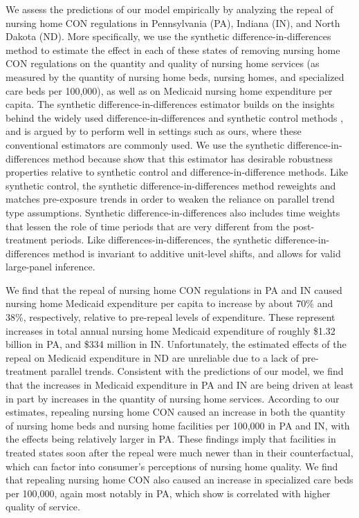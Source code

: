 \documentclass[../Main.tex]{subfiles}
\begin{document}
We assess the predictions of our model empirically by analyzing the repeal of nursing home CON regulations in Pennsylvania (PA), Indiana (IN), and North Dakota (ND). More specifically, we use the synthetic difference-in-differences method \citep{arkhangelsky2021synthetic} to estimate the effect in each of these states of removing nursing home CON regulations on the quantity and quality of nursing home services (as measured by the quantity of nursing home beds, nursing homes, and specialized care beds per 100,000), as well as on Medicaid nursing home expenditure per capita. The synthetic difference-in-differences estimator builds on the insights behind the widely used difference-in-differences and synthetic control methods \citep{abadie2003economic,abadie2010synthetic,currie2020technology}, and is argued by \citet{arkhangelsky2021synthetic} to perform well in settings such as ours, where these conventional estimators are commonly used. We use the synthetic difference-in-differences method because \citet{arkhangelsky2021synthetic} show that this estimator has desirable robustness properties relative to synthetic control and difference-in-difference methods. Like synthetic control, the synthetic difference-in-differences method reweights and matches pre-exposure trends in order to weaken the reliance on parallel trend type assumptions. Synthetic difference-in-differences also includes time weights that lessen the role of time periods that are very different from the post-treatment periods. Like differences-in-differences, the synthetic difference-in-differences method is invariant to additive unit-level shifts, and allows for valid large-panel inference.

We find that the repeal of nursing home CON regulations in PA and IN caused nursing home Medicaid expenditure per capita to increase by about 70\% and 38\%, respectively, relative to pre-repeal levels of expenditure. These represent increases in total annual nursing home Medicaid expenditure of roughly \$1.32 billion in PA, and \$334 million in IN. Unfortunately, the estimated effects of the repeal on Medicaid expenditure in ND are unreliable due to a lack of pre-treatment parallel trends. Consistent with the predictions of our model, we find that the increases in Medicaid expenditure in PA and IN are being driven at least in part by increases in the quantity of nursing home services. According to our estimates, repealing nursing home CON caused an increase in both the quantity of nursing home beds and nursing home facilities per 100,000 in PA and IN, with the effects being relatively larger in PA. These findings imply that facilities in treated states soon after the repeal were much newer than in their counterfactual, which can factor into consumer's perceptions of nursing home quality. We find that repealing nursing home CON also caused an increase in specialized care beds per 100,000, again most notably in PA, which \citet{grabowski2010quality} show is correlated with higher quality of service. 
\end{document}
